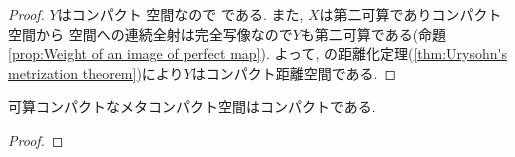 \documentclass[uplatex, dvipdfmx, a4paper, 12pt, class=jsbook, crop=false]{standalone}
\begin{document}
\begin{proof}
	$ Y $はコンパクト \Hausdorff 空間なので  である.
	また, $ X $は第二可算でありコンパクト空間から \Hausdorff 空間への連続全射は完全写像なので$ Y $も第二可算である(命題 \ref{prop:Weight of an image of perfect map}).
	よって, \Urysohn の距離化定理(\ref{thm:Urysohn's metrization theorem})により$ Y $はコンパクト距離空間である.
\end{proof}

\begin{theorem}
	可算コンパクトなメタコンパクト空間はコンパクトである.
\end{theorem}

\begin{proof}
	\WIP
\end{proof}
\end{document}
